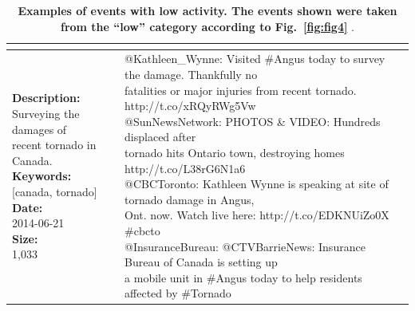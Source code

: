 \documentclass[10pt,letterpaper]{article}
\begin{document}
\begin{table}[!htb]
{\begin{tabular*}{1\linewidth}{p{5cm}p{5cm}}
{        %
      }
      \\
            \midrule
      \pbox{20cm}{\textbf{Description:}\\Surveying the damages of \\ recent tornado in Canada. \vspace{.1cm}\\
        \textbf{Keywords:}\\ {[}canada, tornado{]}\vspace{.1cm}\\
        \textbf{Date:}\\ 2014-06-21 \vspace{.1cm}\\
        \textbf{Size:}\\ 1,033}
      & \pbox{20cm}{
        @Kathleen\_Wynne: Visited \#Angus today to survey the damage. Thankfully no \\fatalities or major injuries from recent tornado. http://t.co/xRQyRWg5Vw\vspace{.1cm}\\
        @SunNewsNetwork: PHOTOS \& VIDEO: Hundreds displaced after \\ tornado hits Ontario town, destroying homes http://t.co/L38rG6N1a6\vspace{.1cm}\\
        @CBCToronto: Kathleen Wynne is speaking at site of tornado damage in Angus, \\Ont. now. Watch live here: http://t.co/EDKNUiZo0X \#cbcto\vspace{.1cm}\\
        @InsuranceBureau: @CTVBarrieNews: Insurance Bureau of Canada is setting up \\a mobile unit in \#Angus today to help residents affected by \#Tornado}
      \\
      \bottomrule
    \end{tabular*}
  }
  \caption{\textbf{
                Examples of events with low activity. The events
      shown were taken from the ``low'' category according to
Fig.~\ref{fig:fig4}}
          .}
  \label{table:low-impact-sample}
\end{table}
\end{document}
